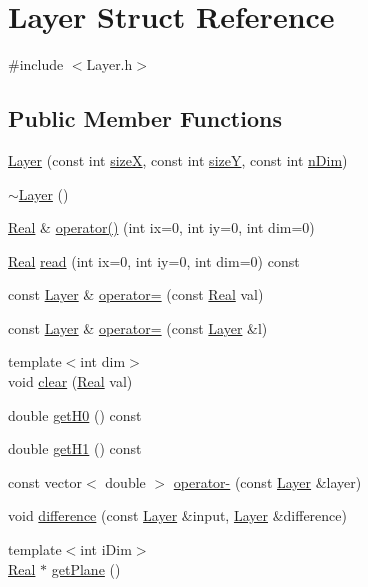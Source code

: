 \hypertarget{struct_layer}{}\section{Layer Struct Reference}
\label{struct_layer}


{\ttfamily \#include $<$Layer.\+h$>$}

\subsection*{Public Member Functions}
\begin{DoxyCompactItemize}
\item 
\hyperlink{struct_layer_a61ced4ca9471c4a2188bb17cd9c8aa51}{Layer} (const int \hyperlink{struct_layer_a4904db3e1890920dd364930bb68efa07}{size\+X}, const int \hyperlink{struct_layer_a7ec60475ab6fdf004e5ed4be01b1a318}{size\+Y}, const int \hyperlink{struct_layer_ab937eda50c83c45e9bc814f6be6abb46}{n\+Dim})
\item 
\hyperlink{struct_layer_a1b1ba4804451dfe6cc357194e42762ae}{$\sim$\+Layer} ()
\item 
\hyperlink{_h_d_f5_dumper_8h_a445a5f0e2a34c9d97d69a3c2d1957907}{Real} \& \hyperlink{struct_layer_a733ff333403d1d8562316da0a24b1669}{operator()} (int ix=0, int iy=0, int dim=0)
\item 
\hyperlink{_h_d_f5_dumper_8h_a445a5f0e2a34c9d97d69a3c2d1957907}{Real} \hyperlink{struct_layer_aa31dc4e4f31fe67d08ca47c52fd3f16e}{read} (int ix=0, int iy=0, int dim=0) const 
\item 
const \hyperlink{struct_layer}{Layer} \& \hyperlink{struct_layer_a3313839c38d5a41930f4b5e197801242}{operator=} (const \hyperlink{_h_d_f5_dumper_8h_a445a5f0e2a34c9d97d69a3c2d1957907}{Real} val)
\item 
const \hyperlink{struct_layer}{Layer} \& \hyperlink{struct_layer_a4b09e4315b70058f14a70758b348aac9}{operator=} (const \hyperlink{struct_layer}{Layer} \&l)
\item 
{\footnotesize template$<$int dim$>$ }\\void \hyperlink{struct_layer_ac4a936af760f24859fcd890e173dfb49}{clear} (\hyperlink{_h_d_f5_dumper_8h_a445a5f0e2a34c9d97d69a3c2d1957907}{Real} val)
\item 
double \hyperlink{struct_layer_aa4a83091a6e4665cf421e35fc952bd1e}{get\+H0} () const 
\item 
double \hyperlink{struct_layer_a08e998684111b47031f8930ebde8d099}{get\+H1} () const 
\item 
const vector$<$ double $>$ \hyperlink{struct_layer_ab00a43d5c2cbe7d6344ad4d6cda77254}{operator-\/} (const \hyperlink{struct_layer}{Layer} \&layer)
\item 
void \hyperlink{struct_layer_a4bcab1de1c5e65873941c0e151c1e176}{difference} (const \hyperlink{struct_layer}{Layer} \&input, \hyperlink{struct_layer}{Layer} \&difference)
\item 
{\footnotesize template$<$int i\+Dim$>$ }\\\hyperlink{_h_d_f5_dumper_8h_a445a5f0e2a34c9d97d69a3c2d1957907}{Real} $\ast$ \hyperlink{struct_layer_a0be3e1cdc4ca169ac015fbdef58da93a}{get\+Plane} ()
\end{DoxyCompactItemize}
